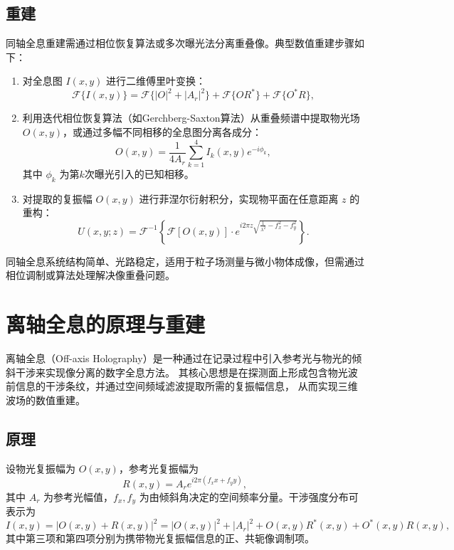 \documentclass[a4paper,draft]{report} %
\begin{document}
\subsection{重建}
同轴全息重建需通过相位恢复算法或多次曝光法分离重叠像。典型数值重建步骤如下：
\begin{enumerate}
    \item 对全息图 $I(x,y)$ 进行二维傅里叶变换：
    \begin{equation}
    \mathcal{F}\{I(x,y)\} = \mathcal{F}\{|O|^2 + |A_r|^2\} + \mathcal{F}\{O R^*\} + \mathcal{F}\{O^* R\},
    \end{equation}
    
    \item 利用迭代相位恢复算法（如Gerchberg-Saxton算法）从重叠频谱中提取物光场 $O(x,y)$，或通过多幅不同相移的全息图分离各成分：
    \begin{equation}
    O(x,y) = \frac{1}{4A_r}\sum_{k=1}^4 I_k(x,y) e^{-i\phi_k},
    \end{equation}
    其中 $\phi_k$ 为第$k$次曝光引入的已知相移。
    
    \item 对提取的复振幅 $O(x,y)$ 进行菲涅尔衍射积分，实现物平面在任意距离 $z$ 的重构：
    \begin{equation}
    U(x,y;z) = \mathcal{F}^{-1} \left\{ \mathcal{F}[O(x,y)] \cdot e^{i 2\pi z \sqrt{\frac{1}{\lambda^2} - f_x^2 - f_y^2}} \right\}.
    \end{equation}
\end{enumerate}

同轴全息系统结构简单、光路稳定，适用于粒子场测量与微小物体成像，但需通过相位调制或算法处理解决像重叠问题。


\section{离轴全息的原理与重建}
离轴全息（Off-axis Holography）是一种通过在记录过程中引入参考光与物光的倾斜干涉来实现像分离的数字全息方法。
其核心思想是在探测面上形成包含物光波前信息的干涉条纹，并通过空间频域滤波提取所需的复振幅信息，
从而实现三维波场的数值重建。
\subsection{原理}
设物光复振幅为 $O(x,y)$，参考光复振幅为
\begin{equation}
R(x,y) = A_r e^{i 2\pi (f_x x + f_y y)},
\end{equation}
其中 $A_r$ 为参考光幅值，$f_x, f_y$ 为由倾斜角决定的空间频率分量。干涉强度分布可表示为
\begin{equation}
I(x,y) = |O(x,y) + R(x,y)|^2 = |O(x,y)|^2 + |A_r|^2 + O(x,y) R^*(x,y) + O^*(x,y) R(x,y),
\end{equation}
其中第三项和第四项分别为携带物光复振幅信息的正、共轭像调制项。
\end{document}
